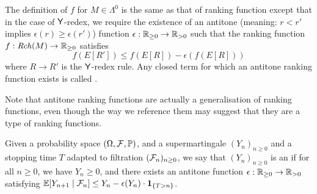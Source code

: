 \begin{definition}\rm
The definition of  $f$ for $M \in \Lambda^0$ is the same as that of ranking function except that in the case of $\tY$-redex, 
we require the existence of an antitone (meaning: $r < r'$ implies $\epsilon(r) \geq \epsilon(r')$) function $\epsilon : \nnReal \to \pReal$ such that the ranking function $f :\mathit{Rch}(M) \to \mathbb{R}_{{\geq}0}$ satisfies
\[f(E[R']) \leq f(E[R]) - \epsilon(f(E[R])) \] 
where $R \to R'$ is the $\tY$-redex rule.
Any closed term for which an antitone ranking function exists is called .
\iffalse
Given a ranking function $f$ on $M \in \Lambda^0$, we say that $f$ is \emph{antitone} if there exists an antitone function\footnote{i.e.~$r < r'$ implies $\epsilon(r) \geq \epsilon(r')$} $\epsilon : \nnReal \to \pReal$ such that %
\[
f(E[R']) \leq f(E[R]) - \epsilon(f(E[R])) 
\]
for all $E[R'] \in \mathit{Rch}(M)$ where $R \to R'$ is the $\tY$-redex rule.
\fi
\end{definition}

Note that antitone ranking functions are actually a generalisation of ranking functions, even though the way we reference them may suggest that they are a type of ranking functions.

\iffalse
\lo{An aside: This CBV $\tY$-rule seems cleaner:
\[
\big(\tY f^{A \to B} \, x^A \, . \, \theta^B \big) \, v \to \theta[(\tY f \, x \, . \, \theta) / f, v / x].
\]
We assume $\tY f^{A \to B} \, x^A \, . \, \theta^B$ is a value.}
\fi

\begin{definition}\rm
Given a probability space $(\Omega, \mathcal{F}, \mathbb{P})$, and a supermartingale $(Y_n)_{n \geq 0}$ and a stopping time $T$ adapted to filtration $(\mathcal{F}_n)_{n \geq 0}$,
we say that $(Y_n)_{n \geq 0}$ is an  if for all $n \geq 0$, we have $Y_n \geq 0$, and there exists an antitone function $\epsilon : \nnReal \to \pReal$ satisfying
\(
\mathbb{E}[Y_{n+1} \mid \mathcal{F}_n] \leq Y_n - \epsilon (Y_n) \cdot {\bf 1}_{\{T > n\}}
\).
\end{definition}


